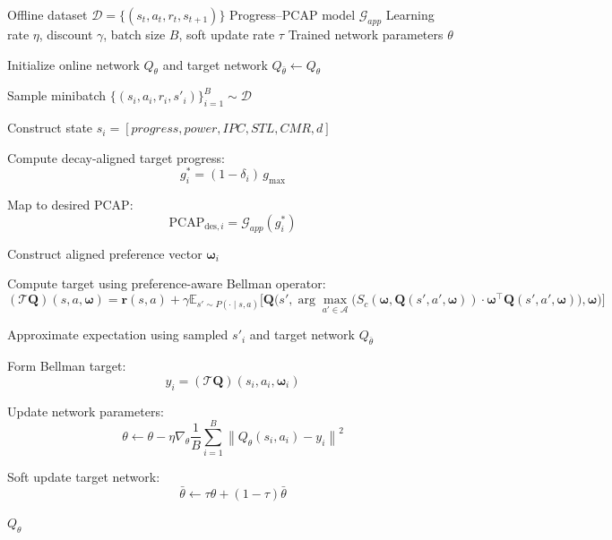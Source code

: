 \begin{algorithm}[t]
\caption{Offline Preference-Aligned Q-Learning}
\label{alg:offline_pref_qlearning}
\begin{algorithmic}[1]
\Require Offline dataset $\mathcal{D}=\{(s_t,a_t,r_t,s_{t+1})\}$
\Require Progress--PCAP model $\mathcal{G}_{app}$
\Require Learning rate $\eta$, discount $\gamma$, batch size $B$, soft update rate $\tau$
\Ensure Trained network parameters $\theta$

\State Initialize online network $Q_\theta$ and target network $Q_{\bar{\theta}} \leftarrow Q_\theta$

    \State Sample minibatch $\{(s_i,a_i,r_i,s'_i)\}_{i=1}^B \sim \mathcal{D}$
    
    \State Construct state $s_i = [progress, power, IPC, STL, CMR, d]$
    
    \State Compute decay-aligned target progress:
    \[
    g_i^* = (1-\delta_i)\, g_{\max}
    \]
    
    \State Map to desired PCAP:
    \[
    \text{PCAP}_{\text{des},i} = \mathcal{G}_{app}(g_i^*)
    \]
    
    \State Construct aligned preference vector $\boldsymbol{\omega}_i$
    
    \State Compute target using preference-aware Bellman operator:
    \begin{equation*}
    (\mathcal{T}\mathbf{Q})(s,a,\boldsymbol{\omega})
    = \mathbf{r}(s,a)
    + \gamma \mathbb{E}_{s' \sim P(\cdot \mid s,a)} \Big[
    \mathbf{Q}\Big(
    s',
    \arg\max_{a' \in \mathcal{A}}
    \big(
    S_c(\boldsymbol{\omega}, \mathbf{Q}(s',a',\boldsymbol{\omega}))
    \cdot
    \boldsymbol{\omega}^{\top} \mathbf{Q}(s',a',\boldsymbol{\omega})
    \big),
    \boldsymbol{\omega}
    \Big)
    \Big]
    \end{equation*}
    
    \State Approximate expectation using sampled $s'_i$ and target network $Q_{\bar{\theta}}$
    
    \State Form Bellman target:
    \[
    y_i = (\mathcal{T}\mathbf{Q})(s_i,a_i,\boldsymbol{\omega}_i)
    \]
    
    \State Update network parameters:
    \[
    \theta \leftarrow \theta - \eta \nabla_\theta
    \frac{1}{B}\sum_{i=1}^B \left\|Q_\theta(s_i,a_i)-y_i\right\|^2
    \]
    
    \State Soft update target network:
    \[
    \bar{\theta} \leftarrow \tau \theta + (1-\tau)\bar{\theta}
    \]
    
\EndFor

\State \Return $Q_\theta$
\end{algorithmic}
\end{algorithm}